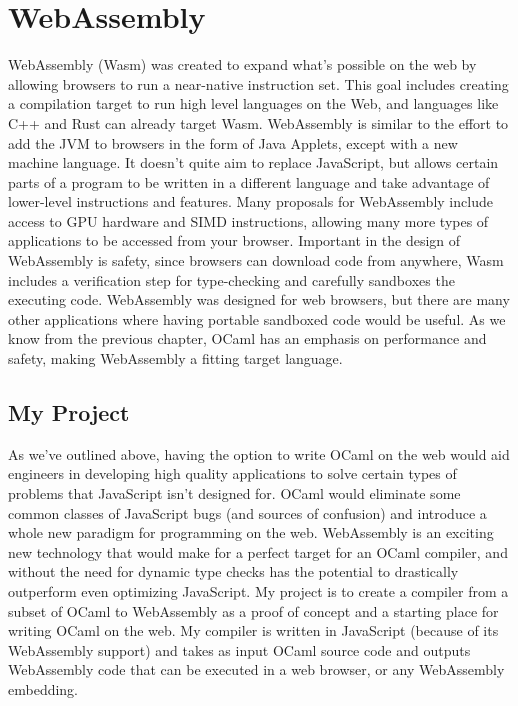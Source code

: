\documentclass[12pt,a4paper,twoside,openright]{report}
\begin{document}
\section{WebAssembly}

WebAssembly (Wasm) was created to expand what's possible on the web by allowing browsers to run a near-native instruction set.
This goal includes creating a compilation target to run high level languages on the Web, and languages like C++ and Rust can already target Wasm.
WebAssembly is similar to the effort to add the JVM to browsers in the form of Java Applets, except with a new machine language.
It doesn't quite aim to replace JavaScript, but allows certain parts of a program to be written in a different language and take advantage of lower-level instructions and features.
Many proposals for WebAssembly include access to GPU hardware and SIMD instructions, allowing many more types of applications to be accessed from your browser.
Important in the design of WebAssembly is safety, since browsers can download code from anywhere, Wasm includes a verification step for type-checking and carefully sandboxes the executing code.
WebAssembly was designed for web browsers, but there are many other applications where having portable sandboxed code would be useful.
As we know from the previous chapter, OCaml has an emphasis on performance and safety, making WebAssembly a fitting target language.

\subsection{My Project}

As we've outlined above, having the option to write OCaml on the web would aid engineers in developing high quality applications to solve certain types of problems that JavaScript isn't designed for.
OCaml would eliminate some common classes of JavaScript bugs (and sources of confusion) and introduce a whole new paradigm for programming on the web.
WebAssembly is an exciting new technology that would make for a perfect target for an OCaml compiler, and without the need for dynamic type checks has the potential to drastically outperform even optimizing JavaScript.
My project is to create a compiler from a subset of OCaml to WebAssembly as a proof of concept and a starting place for writing OCaml on the web.
My compiler is written in JavaScript (because of its WebAssembly support) and takes as input OCaml source code and outputs WebAssembly code that can be executed in a web browser, or any WebAssembly embedding.
\end{document}
